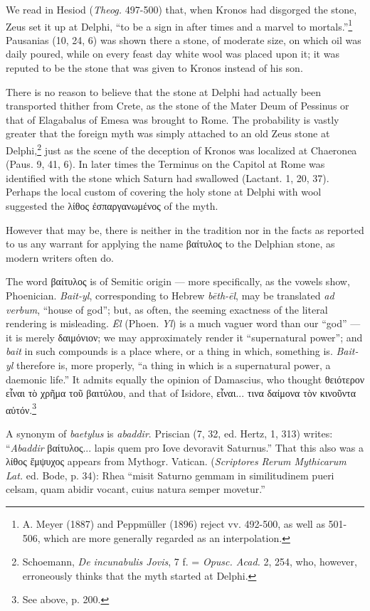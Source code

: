 \documentclass[a4paper, 12pt, oneside, polutonikogreek, english]{article}
\begin{document}
We read in Hesiod (\emph{Theog.} 497-500) that, when Kronos had disgorged the stone, Zeus set it up at Delphi, ``to be a sign in after times and a marvel to mortals.''\footnote{A. Meyer (1887) and Peppmüller (1896) reject vv. 492-500, as well as 501-506, which are more generally regarded as an interpolation.} Pausanias (10, 24, 6) was shown there a stone, of moderate size, on which oil was daily poured, while on every feast day white wool was placed upon it; it was reputed to be the stone that was given to Kronos instead of his son.

There is no reason to believe that the stone at Delphi had actually been transported thither from Crete, as the stone of the Mater Deum of Pessinus or that of Elagabalus of Emesa was brought to Rome. The probability is vastly greater that the foreign myth was simply attached to an old Zeus stone at Delphi,\footnote{Schoemann, \emph{De incunabulis Jovis}, 7 f. = \emph{Opusc. Acad.} 2, 254, who, however, erroneously thinks that the myth started at Delphi.} just as the scene of the deception of Kronos was localized at Chaeronea (Paus. 9, 41, 6). In later times the Terminus on the Capitol at Rome was identified with the stone which Saturn had swallowed (Lactant. 1, 20, 37). Perhaps the local custom of covering the holy stone at Delphi with wool suggested the λίθος ἐσπαργανωμένος of the myth.

However that may be, there is neither in the tradition nor in the facts as reported to us any warrant for applying the name βαίτυλος to the Delphian stone, as modern writers often do.

The word βαίτυλος is of Semitic origin --- more specifically, as the vowels show, Phoenician. \emph{Bait-yl}, corresponding to Hebrew \emph{bēth-ēl}, may be translated \emph{ad verbum}, ``house of god''; but, as often, the seeming exactness of the literal rendering is misleading. \emph{Ēl} (Phoen. \emph{Yl}) is a much vaguer word than our ``god'' --- it is merely δαιμόνιον; we may approximately render it ``supernatural power''; and \emph{bait} in such compounds is a place where, or a thing in which, something is. \emph{Bait-yl} therefore is, more properly, ``a thing in which is a supernatural power, a daemonic life.'' It admits equally the opinion of Damascius, who thought θειότερον εἶναι τὸ χρῆμα τοῦ βαιτύλου, and that of Isidore, εἶναι... τινα δαίμονα τὸν κινοῦντα αὐτόν.\footnote{See above, p. 200.}

A synonym of \emph{baetylus} is \emph{abaddir}. Priscian (7, 32, ed. Hertz, 1, 313) writes: ``\emph{Abaddir} βαίτυλος... lapis quem pro Iove devoravit Saturnus.'' That this also was a λίθος ἔμψυχος appears from Mythogr. Vatican. (\emph{Scriptores Rerum Mythicarum Lat.} ed. Bode, p. 34): Rhea ``misit Saturno gemmam in similitudinem pueri celsam, quam abidir vocant, cuius natura semper movetur.''
\end{document}
